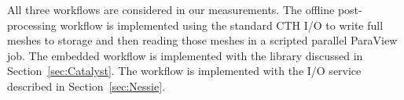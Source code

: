 All three workflows are considered in our measurements.  The offline
post-processing workflow is implemented using the standard CTH I/O to write
full meshes to storage and then reading those meshes in a scripted parallel
ParaView job.  The embedded \insitu workflow is implemented with the
 \insitu library discussed in Section~\ref{sec:Catalyst}.
The \intransit workflow is implemented with the  I/O
service described in Section~\ref{sec:Nessie}.
